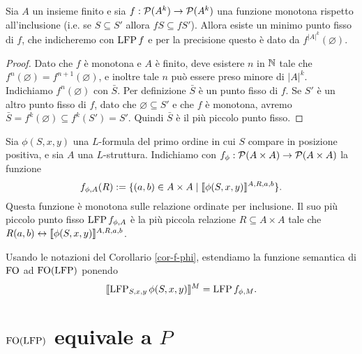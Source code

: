 \begin{teorema}
\label{teo-tarski-knaster}
 Sia $A$ un insieme finito e sia $f: \P(A^k) \to \P(A^k)$ una
 funzione monotona rispetto all'inclusione
 (i.e. se $S \subseteq S'$ allora $f S \subseteq f S'$). Allora esiste un minimo
 punto fisso di $f$, che indicheremo con $\LFP f$ e per la precisione
 questo è dato da $f^{|A|^k}(\varnothing)$.
\end{teorema}

\begin{proof}
 Dato che $f$ è monotona e $A$ è finito, deve esistere $n$ in $\N$ tale che
 $f^n(\varnothing) = f^{n+1}(\varnothing)$, e inoltre tale $n$ può essere preso
 minore di $|A|^k$. Indichiamo $f^n(\varnothing)$ con $\bar{S}$.
 Per definizione $\bar{S}$ è un punto fisso di $f$.
 Se $S'$ è un altro punto fisso di $f$, dato che $\varnothing \subseteq S'$ e
 che $f$ è monotona, avremo $\bar{S} = f^k(\varnothing) \subseteq f^k(S') = S'$.
 Quindi $\bar{S}$ è il più piccolo punto fisso.
\end{proof}



\begin{corollario}
\label{cor-f-phi}
 Sia $\phi(S,x,y)$ una $L$-formula del primo ordine in cui $S$ compare in posizione
 positiva, e sia $A$ una $L$-struttura.
 Indichiamo con $f_\phi: \P (A \times A) \to \P (A\times A)$ la funzione
 \[ f_{\phi,A}(R) := \{ (a,b) \in A \times A \mid \semantic{ \phi (S,x,y)}^{A,R,a,b} \}. \]
 Questa funzione è monotona sulle relazione ordinate per inclusione.
 Il suo più piccolo punto fisso $\LFP f_{\phi,A}$ è la più piccola relazione
 $R \subseteq A \times A$ tale che $R(a,b) \leftrightarrow \semantic{\phi(S,x,y)}^{A,R,a,b}$.
\end{corollario}

\begin{definizione}
 Usando le notazioni del Corollario \ref{cor-f-phi}, estendiamo la funzione
 semantica di $\FO$ ad $\FO(\LFP)$ ponendo
 \[\semantic{\LFP_{S,x,y} \phi(S,x,y)}^M = \LFP f_{\phi,M}.\]
\end{definizione}

\section{$\FO(\LFP)$ equivale a $P$}

